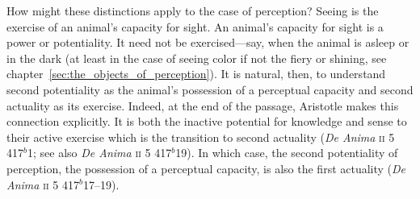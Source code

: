How might these distinctions apply to the case of perception? Seeing is the exercise of an animal's capacity for sight. An animal's capacity for sight is a power or potentiality. It need not be exercised---say, when the animal is asleep or in the dark (at least in the case of seeing color if not the fiery or shining, see chapter~\ref{sec:the_objects_of_perception}). It is natural, then, to understand second potentiality as the animal's possession of a perceptual capacity and second actuality as its exercise. Indeed, at the end of the passage, Aristotle makes this connection explicitly. It is both the inactive potential for knowledge and sense to their active exercise which is the transition to second actuality (\emph{De Anima} \textsc{ii} 5 417\( ^{b} \)1; see also \emph{De Anima} \textsc{ii} 5 417\( ^{b} \)19). In which case, the second potentiality of perception, the possession of a perceptual capacity, is also the first actuality (\emph{De Anima} \textsc{ii} 5 417\( ^{b} \)17--19).
% 

